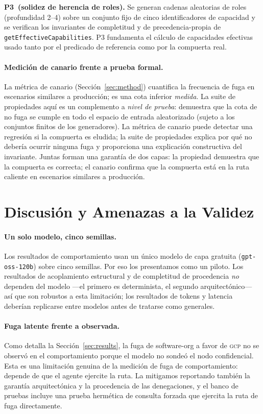 \documentclass[10pt,twocolumn,letterpaper]{article}
\newcommand{\gcp}{\textsc{gcp}}
\begin{document}
\textbf{P3~(solidez de herencia de roles).}
Se generan cadenas aleatorias de roles (profundidad 2--4) sobre un conjunto fijo
de cinco identificadores de capacidad y se verifican los invariantes de completitud
y de precedencia-propia de \texttt{getEffectiveCapabilities}. P3 fundamenta el
cálculo de capacidades efectivas usado tanto por el predicado de referencia como
por la compuerta real.

\paragraph{Medición de canario frente a prueba formal.}
La métrica de canario (Sección~\ref{sec:method}) cuantifica la frecuencia de fuga
en escenarios similares a producción; es una cota inferior \emph{medida}. La suite
de propiedades aquí es un complemento a \emph{nivel de prueba}: demuestra que la
cota de no fuga se cumple en todo el espacio de entrada aleatorizado (sujeto a los
conjuntos finitos de los generadores). La métrica de canario puede detectar una
regresión si la compuerta es eludida; la suite de propiedades explica por qué no
debería ocurrir ninguna fuga y proporciona una explicación constructiva del
invariante. Juntas forman una garantía de dos capas: la propiedad demuestra que la
compuerta es correcta; el canario confirma que la compuerta está en la ruta
caliente en escenarios similares a producción.

\section{Discusión y Amenazas a la Validez}
\label{sec:threats}

\paragraph{Un solo modelo, cinco semillas.} Los resultados de comportamiento usan
un único modelo de capa gratuita (\texttt{gpt-oss-120b}) sobre cinco semillas. Por
eso los presentamos como un piloto. Los resultados de acoplamiento estructural y de
completitud de procedencia \emph{no} dependen del modelo ---el primero es
determinista, el segundo arquitectónico--- así que son robustos a esta limitación;
los resultados de tokens y latencia deberían replicarse entre modelos antes de
tratarse como generales.

\paragraph{Fuga latente frente a observada.} Como detalla la
Sección~\ref{sec:results}, la fuga de software-org a favor de \gcp{} no se observó
en el comportamiento porque el modelo no sondeó el nodo confidencial. Esta es una
limitación genuina de la medición de fuga de comportamiento: depende de que el
agente ejercite la ruta. La mitigamos reportando también la garantía arquitectónica
y la procedencia de las denegaciones, y el banco de pruebas incluye una prueba
hermética de consulta forzada que ejercita la ruta de fuga directamente.
\end{document}
